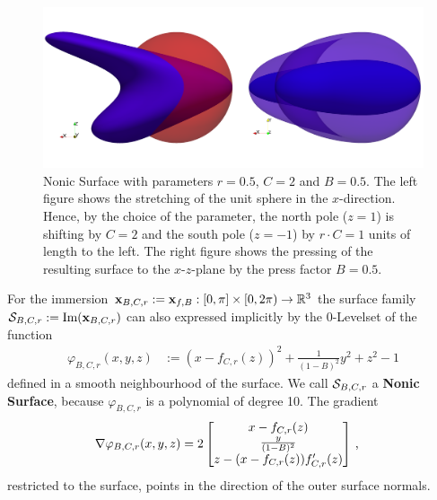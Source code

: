 \documentclass[a4paper,11pt]{scrartcl}
\newcommand{\pstretch}{C}
\newcommand{\pprop}{r}
\newcommand{\ppress}{B}
\begin{document}
\begin{figure}
  \centering
  \includegraphics[width=.9\textwidth]{stuff/paraview/Sphere2Nonic2NonicPressed.png}
  \caption{Nonic Surface with parameters \( \pprop = 0.5 \), \( \pstretch = 2 \) and \( \ppress = 0.5 \).
           The left figure shows the stretching of the unit sphere in the \( x \)-direction.
           Hence, by the choice of the parameter, the north pole (\( z=1 \)) is shifting by \( \pstretch = 2 \) 
           and the south pole (\( z=-1 \)) by \( \pprop\cdot\pstretch = 1 \) units of length to the left. 
           The right figure shows the pressing of the resulting surface to the \( x \)-\( z \)-plane by the press factor \( \ppress=0.5 \).
           }
  \label{fig:SphereToNonicPressed}
\end{figure}
For the immersion \( \Xb_{\ppress,\pstretch,\pprop} := \Xb_{f,\ppress}:[0,\pi]\times[0,2\pi)\rightarrow\R^{3}  \)
the surface family \( \surf_{\ppress,\pstretch,\pprop} := \text{Im}(\Xb_{\ppress,\pstretch,\pprop})\)
can also expressed implicitly by the 0-Levelset of the function
\begin{align}
  \varphi_{\ppress,\pstretch,\pprop}(x,y,z) &:= \left( x - f_{\pstretch,\pprop}(z) \right)^{2} + \frac{1}{(1-\ppress)^{2}}y^{2} + z^{2} - 1
\end{align}
defined in a smooth neighbourhood of the surface.
We call \( \surf_{\ppress,\pstretch,\pprop} \) a \textbf{Nonic Surface}, because \( \varphi_{\ppress,\pstretch,\pprop} \) is a polynomial of
degree 10.
The gradient
\begin{align}
  \nabla\varphi_{\ppress,\pstretch,\pprop}(x,y,z) &= 2
      \begin{bmatrix}
        x - f_{\pstretch,\pprop}(z) \\
        \frac{y}{(1-\ppress)^{2}} \\
        z-(x-f_{\pstretch,\pprop}(z))f'_{\pstretch,\pprop}(z)
      \end{bmatrix}\formComma
\end{align}
restricted to the surface, points in the direction of the outer surface normals.
\end{document}
